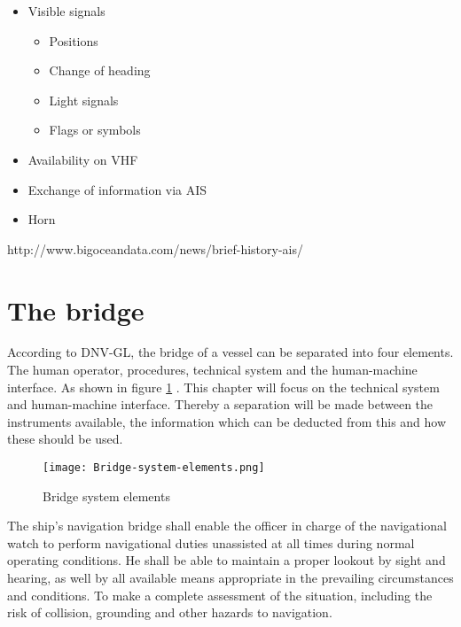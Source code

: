\begin{itemize}
	\item Visible signals
	\begin{itemize}
		\item Positions
		\item Change of heading
		\item Light signals
		\item Flags or symbols
	\end{itemize}
	\item Availability on \ac{VHF}
	\item Exchange of information via \ac{AIS}
	\item Horn
\end{itemize}

http://www.bigoceandata.com/news/brief-history-ais/

\section{The bridge}
According to DNV-GL, the bridge of a vessel can be separated into four elements. The human operator, procedures,
technical system and the human-machine interface. As shown in figure \ref{fig:Bridge-system-elements} \cite{DNVGL2011}. This chapter will focus on the technical system and human-machine interface. Thereby a separation will be made between the instruments available, the information which can be deducted from this and how these should be used. 

\begin{figure}[H]
	\centering
	\texttt{[image: Bridge-system-elements.png]}
	\caption{Bridge system elements}
	\label{fig:Bridge-system-elements}
\end{figure}

The ship’s navigation bridge shall enable the officer in charge of the navigational watch to perform navigational duties unassisted at all times during normal operating conditions. He shall be able to maintain a proper lookout by sight and hearing, as well by all available means appropriate in the prevailing circumstances and conditions. To make a complete assessment of the situation, including the risk of collision, grounding and other hazards to navigation.

